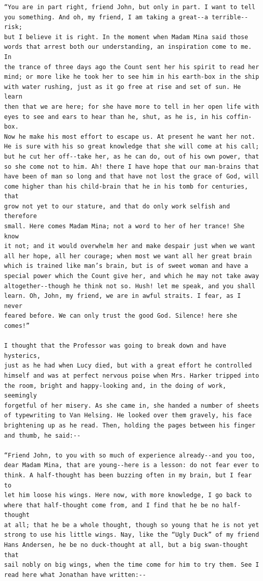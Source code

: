 \documentclass{article}
\begin{document}
\begin{verbatim}
“You are in part right, friend John, but only in part. I want to tell
you something. And oh, my friend, I am taking a great--a terrible--risk;
but I believe it is right. In the moment when Madam Mina said those
words that arrest both our understanding, an inspiration come to me. In
the trance of three days ago the Count sent her his spirit to read her
mind; or more like he took her to see him in his earth-box in the ship
with water rushing, just as it go free at rise and set of sun. He learn
then that we are here; for she have more to tell in her open life with
eyes to see and ears to hear than he, shut, as he is, in his coffin-box.
Now he make his most effort to escape us. At present he want her not.
He is sure with his so great knowledge that she will come at his call;
but he cut her off--take her, as he can do, out of his own power, that
so she come not to him. Ah! there I have hope that our man-brains that
have been of man so long and that have not lost the grace of God, will
come higher than his child-brain that he in his tomb for centuries, that
grow not yet to our stature, and that do only work selfish and therefore
small. Here comes Madam Mina; not a word to her of her trance! She know
it not; and it would overwhelm her and make despair just when we want
all her hope, all her courage; when most we want all her great brain
which is trained like man’s brain, but is of sweet woman and have a
special power which the Count give her, and which he may not take away
altogether--though he think not so. Hush! let me speak, and you shall
learn. Oh, John, my friend, we are in awful straits. I fear, as I never
feared before. We can only trust the good God. Silence! here she comes!”

I thought that the Professor was going to break down and have hysterics,
just as he had when Lucy died, but with a great effort he controlled
himself and was at perfect nervous poise when Mrs. Harker tripped into
the room, bright and happy-looking and, in the doing of work, seemingly
forgetful of her misery. As she came in, she handed a number of sheets
of typewriting to Van Helsing. He looked over them gravely, his face
brightening up as he read. Then, holding the pages between his finger
and thumb, he said:--

“Friend John, to you with so much of experience already--and you too,
dear Madam Mina, that are young--here is a lesson: do not fear ever to
think. A half-thought has been buzzing often in my brain, but I fear to
let him loose his wings. Here now, with more knowledge, I go back to
where that half-thought come from, and I find that he be no half-thought
at all; that he be a whole thought, though so young that he is not yet
strong to use his little wings. Nay, like the “Ugly Duck” of my friend
Hans Andersen, he be no duck-thought at all, but a big swan-thought that
sail nobly on big wings, when the time come for him to try them. See I
read here what Jonathan have written:--


\end{verbatim}
\end{document}
